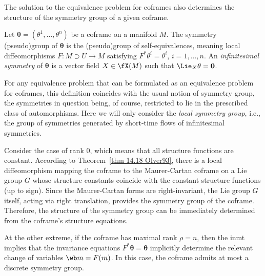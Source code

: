 \PRLsep 

The solution to the equivalence problem for coframes also determines the structure of the symmetry group of a given coframe.

\begin{defn}
    Let $\bm\theta=(\theta^1,\ldots,\theta^n)$ be a coframe on a manifold $M$. The symmetry (pseudo)group of $\bm\theta$ is the (pseudo)group of self-equivalences, meaning local diffeomorphisms $F:M\supset U\to M$ satisfying $F^\ast \theta^i=\theta^i$, $i=1,\ldots,n$. An \emph{infinitesimal symmetry} of $\bm\theta$ is a vector field $X\in\fX(M)$ such that $\Lie_X \bf{\theta}=0$.
\end{defn}

For any equivalence problem that can be formulated as an equivalence problem for coframes, this definition coincides with the usual notion of symmetry group, the symmetries in question being, of course, restricted to lie in the prescribed class of automorphisms. Here we will only consider the \emph{local symmetry group}, i.e., the group of symmetries generated by short-time flows of infinitesimal symmetries.

Consider the case of rank $0$, which means that all structure functions are constant. According to Theorem~\ref{thm 14.18 Olver93}, there is a local diffeomorphism mapping the coframe to the Maurer-Cartan coframe on a Lie group $G$ whose structure constants coincide with the constant structure functions (up to sign). Since the Maurer-Cartan forms are right-invariant, the Lie group $G$ itself, acting via right translation, provides the symmetry group of the coframe. Therefore, the structure of the symmetry group can be immediately determined from the coframe's structure equations.

At the other extreme, if the coframe has maximal rank $\rho=n$, then the \gls{inmt} implies that the invariance equations $F^\ast\bm\theta=\bm\theta$ implicitly determine the relevant change of variables $\wb m=F(m)$. In this case, the coframe admits at most a discrete symmetry group. 


